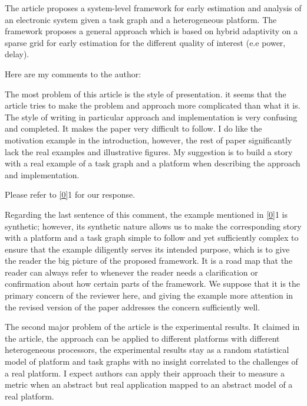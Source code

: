 \begin{reviewer}
The article proposes a system-level framework for early estimation and analysis
of an electronic system given a task graph and a heterogeneous platform. The
framework proposes a general approach which is based on hybrid adaptivity on a
sparse grid  for early estimation for the different quality of interest (e.e
power, delay).

Here are my comments to the author:

The most problem of this article is the style of presentation. it seems that the
article tries to make the problem and approach more complicated than what it is.
The style of writing in particular approach and implementation is very confusing
and completed. It makes the paper very difficult to follow. I do like the
motivation example in the introduction, however, the rest of paper significantly
lack the real examples and illustrative figures. My suggestion is to build a
story with a real example of a task graph and a platform when describing the
approach and implementation.
\end{reviewer}

\begin{authors}
Please refer to \cref{0}{1} for our response.

Regarding the last sentence of this comment, the example mentioned in
\cref{0}{1} is synthetic; however, its synthetic nature allows us to make the
corresponding story with a platform and a task graph simple to follow and yet
sufficiently complex to ensure that the example diligently serves its intended
purpose, which is to give the reader the big picture of the proposed framework.
It is a road map that the reader can always refer to whenever the reader needs a
clarification or confirmation about how certain parts of the framework. We
suppose that it is the primary concern of the reviewer here, and giving the
example more attention in the revised version of the paper addresses the concern
sufficiently well.

\begin{actions}
\end{actions}
\end{authors}

\begin{reviewer}
The second major problem of the article is the experimental results. It claimed
in the article, the approach can be applied to different platforms with
different heterogeneous processors, the experimental results stay as a random
statistical model of platform and task graphs with no insight correlated to the
challenges of a real platform. I expect authors can apply their approach their
to measure a metric when an abstract but real application mapped to an abstract
model of a real platform.
\end{reviewer}

